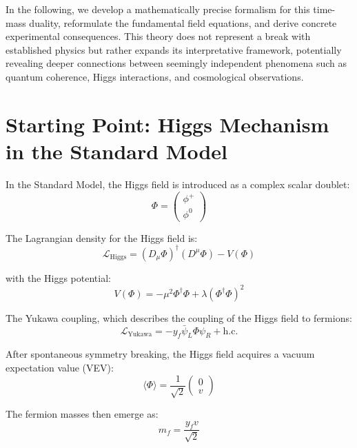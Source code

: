 \documentclass[a4paper,12pt]{article}
\begin{document}
	In the following, we develop a mathematically precise formalism for this time-mass duality, reformulate the fundamental field equations, and derive concrete experimental consequences. This theory does not represent a break with established physics but rather expands its interpretative framework, potentially revealing deeper connections between seemingly independent phenomena such as quantum coherence, Higgs interactions, and cosmological observations.
	
	\section{Starting Point: Higgs Mechanism in the Standard Model}
	
	In the Standard Model, the Higgs field is introduced as a complex scalar doublet:
	\begin{equation}
		\Phi = \begin{pmatrix} \phi^+ \\ \phi^0 \end{pmatrix}
	\end{equation}
	
	The Lagrangian density for the Higgs field is:
	\begin{equation}
		\mathcal{L}_{\text{Higgs}} = (D_\mu \Phi)^\dagger (D^\mu \Phi) - V(\Phi)
	\end{equation}
	
	with the Higgs potential:
	\begin{equation}
		V(\Phi) = -\mu^2 \Phi^\dagger \Phi + \lambda (\Phi^\dagger \Phi)^2
	\end{equation}
	
	The Yukawa coupling, which describes the coupling of the Higgs field to fermions:
	\begin{equation}
		\mathcal{L}_{\text{Yukawa}} = -y_f \bar{\psi}_L \Phi \psi_R + \text{h.c.}
	\end{equation}
	
	After spontaneous symmetry breaking, the Higgs field acquires a vacuum expectation value (VEV):
	\begin{equation}
		\langle \Phi \rangle = \frac{1}{\sqrt{2}} \begin{pmatrix} 0 \\ v \end{pmatrix}
	\end{equation}
	
	The fermion masses then emerge as:
	\begin{equation}
		m_f = \frac{y_f v}{\sqrt{2}}
	\end{equation}
	
\end{document}
